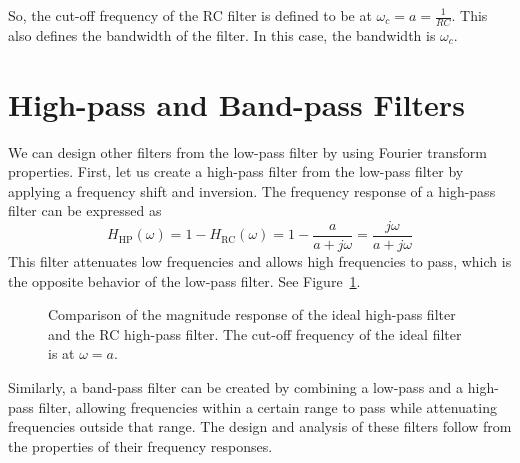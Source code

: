 So, the cut-off frequency of the RC filter is defined to be at \(\omega_c = a = \frac{1}{RC}\). This also defines the bandwidth of the filter. In this case, the bandwidth is \(\omega_c\).

\section{High-pass and Band-pass Filters}
We can design other filters from the low-pass filter by using Fourier transform properties. First, let us create a high-pass filter from the low-pass filter by applying a frequency shift and inversion. The frequency response of a high-pass filter can be expressed as
\[
H_{\text{HP}}(\omega) = 1 - H_{\text{RC}}(\omega) = 1 - \frac{a}{a + j \omega} = \frac{j \omega}{a + j \omega}
\]
This filter attenuates low frequencies and allows high frequencies to pass, which is the opposite behavior of the low-pass filter. See Figure~\ref{fig:mag-high-pass}.
\begin{figure}
    \centering
    \caption{Comparison of the magnitude response of the ideal high-pass filter and the RC high-pass filter. The cut-off frequency of the ideal filter is at $\omega = a$.}
    \label{fig:mag-high-pass}
\end{figure}

Similarly, a band-pass filter can be created by combining a low-pass and a high-pass filter, allowing frequencies within a certain range to pass while attenuating frequencies outside that range. The design and analysis of these filters follow from the properties of their frequency responses.

